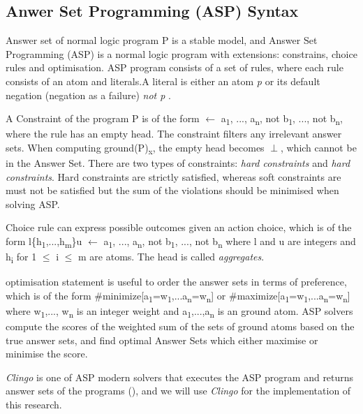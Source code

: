 \documentclass[12pt,twoside]{report}
\begin{document}
\subsection{Anwer Set Programming (ASP) Syntax}

Answer set of normal logic program P is a stable model, and Answer Set Programming (ASP) is a normal logic program with extensions: constrains, choice rules and optimisation. ASP program consists of a set of rules, where each rule consists of an atom and literals.A literal is either an atom \textit{p} or its default negation (negation as a failure) \textit{not p} .

A Constraint of the program P is of the form $\leftarrow$ a\textsubscript{1}, ..., a\textsubscript{n}, not b\textsubscript{1}, ..., not b\textsubscript{n}, where the rule has an empty head. The constraint filters any irrelevant answer sets. When computing ground(P)\textsubscript{x}, the empty head becomes $\perp$, which cannot be in the Answer Set.
There are two types of constraints: \textit{hard constraints} and \textit{hard constraints}. Hard constraints are strictly satisfied, whereas soft constraints are must not be satisfied but the sum of the violations should be minimised when solving ASP.

Choice rule can express possible outcomes given an action choice, which is of the form
l\{h\textsubscript{1},...,h\textsubscript{m}\}u $\leftarrow$ a\textsubscript{1}, ..., a\textsubscript{n}, not b\textsubscript{1}, ..., not b\textsubscript{n} where  l and u are integers and h\textsubscript{i} for 1 $\leq$ i $\leq$ m are atoms. The head is called \textit{aggregates}.

optimisation statement is useful to order the answer sets in terms of preference, which is of the form
\#minimize[a\textsubscript{1}=w\textsubscript{1},...a\textsubscript{n}=w\textsubscript{n}] or \#maximize[a\textsubscript{1}=w\textsubscript{1},...a\textsubscript{n}=w\textsubscript{n}] where w\textsubscript{1},..., w\textsubscript{n} is an integer weight and a\textsubscript{1},...,a\textsubscript{n} is an ground atom.  ASP solvers compute the scores of the weighted sum of the sets of ground atoms based on the true answer sets, and find optimal Answer Sets which either maximise or minimise the score.

\textit{Clingo} is one of ASP modern solvers that executes the ASP program and returns answer sets of the programs (\cite{Gebser2011}), and we will use \textit{Clingo} for the implementation of this research.
\end{document}
